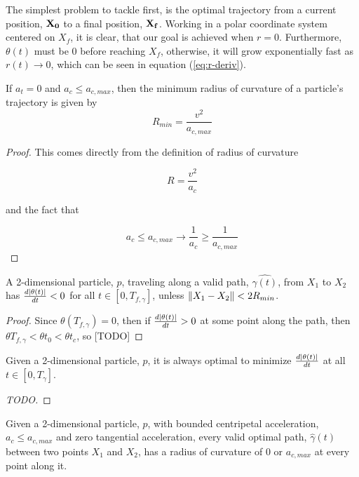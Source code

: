 The simplest problem to tackle first, is the optimal trajectory from a current position, $\mathbf{X_0}$ to a final position, $\mathbf{X_f}$. Working in a polar coordinate system centered on $X_f$, it is clear, that our goal is achieved when $r = 0$. Furthermore, $\theta(t)$ must be $0$ before reaching $X_f$, otherwise, it will grow exponentially fast as $r(t) \to 0$, which can be seen in equation (\ref{eq:r-deriv}).

\begin{lemma}
If $a_t=0$ and $a_c \le a_{c,max}$, then the minimum radius of curvature of a particle's trajectory is given by
\begin{equation}
R_{min} = \frac{v^2}{a_{c,max}}
\end{equation}
\end{lemma}

\begin{proof}
This comes directly from the definition of radius of curvature 

\[
R = \frac{v^2}{a_c}
\]

and the fact that 

\[
a_c \le a_{c,max} \to \frac{1}{a_c} \ge \frac{1}{a_{c,max}}
\]
\end{proof}

\begin{theorem}
A 2-dimensional particle, $p$, traveling along a valid path, $\hat{\gamma(t)}$, from $X_1$ to $X_2$ has $\frac{d\abs{\theta(t)}}{dt} < 0$ for all $t \in [0, T_{f, \gamma}]$, unless $\norm{X_1 - X_2} < 2 R_{min}$.
\end{theorem}

\begin{proof}
Since $\theta(T_{f,\gamma}) = 0$, then if $\frac{d\abs{\theta(t)}}{dt} > 0$ at some point along the path, then $\theta{T_{f,\gamma}} < \theta{t_0} < \theta{t_c}$, so [TODO]
\end{proof}

\begin{theorem}
Given a 2-dimensional particle, $p$, it is always optimal to minimize $\frac{d\abs{\theta(t)}}{dt}$ at all $t \in [0, T_{\gamma}]$.
\end{theorem}

\begin{proof}
[TODO]
\end{proof}

\begin{theorem}
Given a 2-dimensional particle, $p$, with bounded centripetal acceleration, $a_c \le a_{c,max}$ and zero tangential acceleration, every valid optimal path, $\hat{\gamma}(t)$ between two points $X_1$ and $X_2$, has a radius of curvature of $0$ or $a_{c,max}$ at every point along it.
\end{theorem}

